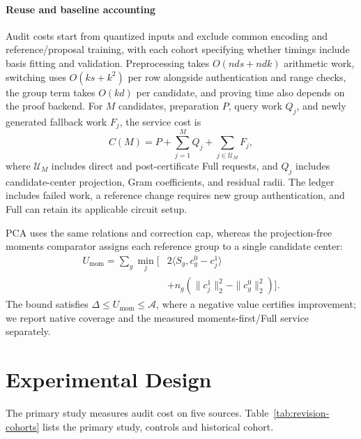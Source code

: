 \documentclass[5p,times,twocolumn]{elsarticle}
\begin{document}
\paragraph{Reuse and baseline accounting}
Audit costs start from quantized inputs and exclude common encoding and reference/proposal training, with each cohort specifying whether timings include basis fitting and validation. Preprocessing takes $O(nds+ndk)$ arithmetic work, switching uses $O(ks+k^2)$ per row alongside authentication and range checks, the group term takes $O(kd)$ per candidate, and proving time also depends on the proof backend. For $M$ candidates, preparation $P$, query work $Q_j$, and newly generated fallback work $F_j$, the service cost is
\begin{equation}
 C(M)=P+\sum_{j=1}^{M}Q_j+\sum_{j\in\mathcal U_M}F_j,
 \label{eq:methodology-cost}
\end{equation}
where $\mathcal U_M$ includes direct and post-certificate Full requests, and $Q_j$ includes candidate-center projection, Gram coefficients, and residual radii. The ledger includes failed work, a reference change requires new group authentication, and Full can retain its applicable circuit setup.

PCA uses the same relations and correction cap, whereas the projection-free moments comparator assigns each reference group to a single candidate center:
\begin{equation}
 \begin{aligned}
 U_{\mathrm{mom}}=\sum_g\min_j\bigl[&2\langle S_g,c^0_g-c^1_j\rangle\\
 &+n_g(\|c^1_j\|_2^2-\|c^0_g\|_2^2)\bigr].
 \end{aligned}
 \label{eq:methodology-moments-baseline}
\end{equation}
The bound satisfies $\Delta\leq U_{\mathrm{mom}}\leq\mathcal A$, where a negative value certifies improvement; we report native coverage and the measured moments-first/Full service separately.




\section{Experimental Design}
\label{sec:experimental-design}
The primary study measures audit cost on five sources. Table~\ref{tab:revision-cohorts} lists the primary study, controls and
historical cohort.
\end{document}
